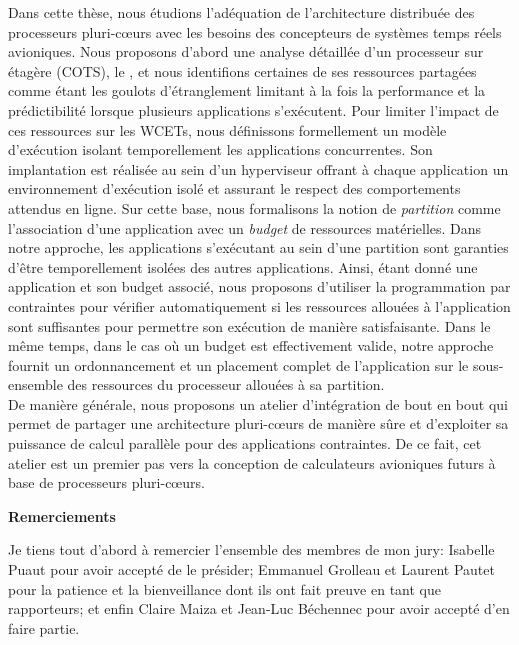 \documentclass[main.tex]{subfiles}
\begin{document}
Dans cette thèse, nous étudions l'adéquation de l'architecture distribuée des
processeurs pluri-c\oe{}urs avec les besoins des concepteurs de systèmes temps
réels avioniques. Nous proposons d'abord une analyse détaillée d'un processeur
sur étagère (COTS), le \mppalong, et nous identifions certaines de ses
ressources partagées comme étant les goulots d'étranglement limitant à la fois
la performance et la prédictibilité lorsque plusieurs applications s'exécutent.
Pour limiter l'impact de ces ressources sur les WCETs, nous définissons
formellement un modèle d'exécution isolant temporellement les applications
concurrentes.  Son implantation est réalisée au sein d’un hyperviseur offrant à
chaque application un environnement d'exécution isolé et assurant le respect des
comportements attendus en ligne.  Sur cette base, nous formalisons la notion de
\emph{partition} comme l'association d'une application avec un \emph{budget} de
ressources matérielles. Dans notre approche, les applications s'exécutant au
sein d'une partition sont garanties d'être temporellement isolées des autres
applications. Ainsi, étant donné une application et son budget associé, nous
proposons d'utiliser la programmation par contraintes pour vérifier
automatiquement si les ressources allouées à l'application sont suffisantes pour
permettre son exécution de manière satisfaisante. Dans le même temps, dans le
cas où un budget est effectivement valide, notre approche fournit un
ordonnancement et un placement complet de l'application sur le sous-ensemble des
ressources du processeur allouées à sa partition.\\

De manière générale, nous proposons un atelier d'intégration de bout en bout qui
permet de partager une architecture pluri-c\oe{}urs de manière sûre et
d'exploiter sa puissance de calcul parallèle pour des applications contraintes.
De ce fait, cet atelier est un premier pas vers la conception de calculateurs
avioniques futurs à base de processeurs pluri-c\oe{}urs.

\cleardoublepage


\begin{center} \LARGE \bf
Remerciements
\vspace{10mm} \end{center}


Je tiens tout d'abord à remercier l'ensemble des membres de mon jury: Isabelle
Puaut pour avoir accepté de le présider;  Emmanuel Grolleau et Laurent Pautet
pour la patience et la bienveillance dont ils ont fait preuve en tant que
rapporteurs; et enfin Claire Maiza et Jean-Luc Béchennec pour avoir accepté d'en
faire partie. \\
\end{document}

